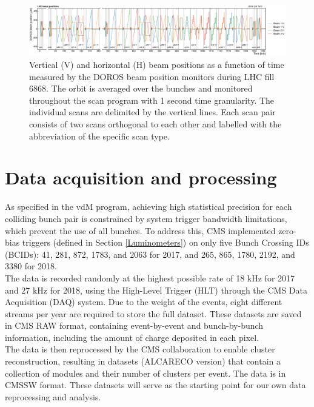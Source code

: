   \begin{figure}[h]
  \hspace{-0.4cm}
    \includegraphics[scale=.17]{Chapter3/BeamPosition/doros_vs_time_6868.pdf}
    \caption[Beam Position in vdM scan 2017]{Vertical (V) and horizontal (H) beam positions as a function of time measured by the DOROS beam position monitors during LHC fill 6868. The orbit is averaged over the bunches and monitored throughout the scan program with 1 second time granularity. The individual scans are delimited by the vertical lines. Each scan pair consists of two scans orthogonal to each other and labelled with the abbreviation of the specific scan type.}
    \label{BeamPosition_2018}
  \end{figure}



\section{Data acquisition and processing}
\label{data}

As specified in the vdM program, achieving high statistical precision for each colliding bunch pair is constrained by system trigger bandwidth limitations, which prevent the use of all bunches. To address this, CMS implemented zero-bias triggers (defined in Section \ref{Luminometers}) on only five Bunch Crossing IDs (BCIDs): 41, 281, 872, 1783, and 2063 for 2017, and 265, 865, 1780, 2192, and 3380 for 2018.\\

The data is recorded randomly at the highest possible rate of 18 kHz for 2017 and 27 kHz  for 2018, using the High-Level Trigger (HLT) through the CMS Data Acquisition (DAQ) system. Due to the weight of the events, eight different streams per year are required to store the full dataset. These datasets are saved in CMS RAW format, containing event-by-event and bunch-by-bunch information, including the amount of charge deposited in each pixel.\\ 

The data is then reprocessed by the CMS collaboration to enable cluster reconstruction, resulting in datasets (ALCARECO version) that contain a collection of modules and their number of clusters per event. The data is in CMSSW format. These datasets will serve as the starting point for our own data reprocessing and analysis.\\

